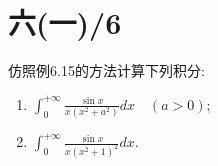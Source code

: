 \documentclass[11pt,a4paper]{article}
\author{刘逸灏 (515370910207)}
\begin{document}
\maketitle

\section{六(一)/6}
\begin{problem}
仿照例6.15的方法计算下列积分:
\begin{enumerate}
  \item $\displaystyle\int_0^{+\infty}\frac{\sin x}{x(x^2+a^2)}dx\quad(a>0)$;
  \item $\displaystyle\int_0^{+\infty}\frac{\sin x}{x(x^2+1)^2}dx$.
\end{enumerate}
\end{problem}
\end{document}
